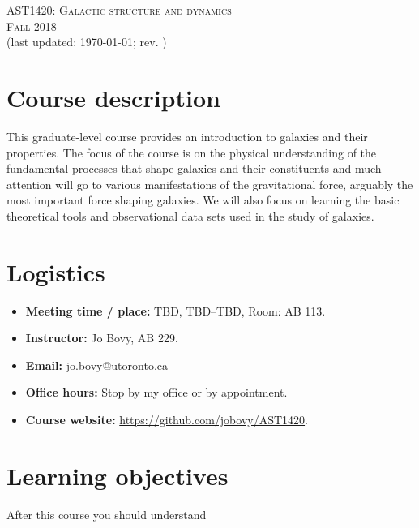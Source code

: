 \documentclass{article}
\begin{document}
\begin{center}
  \LARGE{\scshape{AST1420: Galactic structure and dynamics}}\\[5pt]
  \Large{\scshape{Fall 2018}}\\[5pt]
  \large{(last updated: \today; rev. \githash)}\\[25pt]
\end{center}

\section*{Course description}

This graduate-level course provides an introduction to galaxies and
their properties. The focus of the course is on the physical
understanding of the fundamental processes that shape galaxies and
their constituents and much attention will go to various
manifestations of the gravitational force, arguably the most important
force shaping galaxies. We will also focus on learning the basic
theoretical tools and observational data sets used in the study of
galaxies.

\section*{Logistics}

\begin{itemize}

  \item {\bf Meeting time / place:} TBD, TBD--TBD, Room: AB 113.

  \item {\bf Instructor:} Jo Bovy, AB 229.

  \item {\bf Email:} \href{mailto:jo.bovy@utoronto.ca}{jo.bovy@utoronto.ca}

  \item {\bf Office hours:} Stop by my office or by appointment.

  \item {\bf Course website:} \url{https://github.com/jobovy/AST1420}.

\end{itemize}

\section*{Learning objectives}

After this course you should understand
\end{document}
